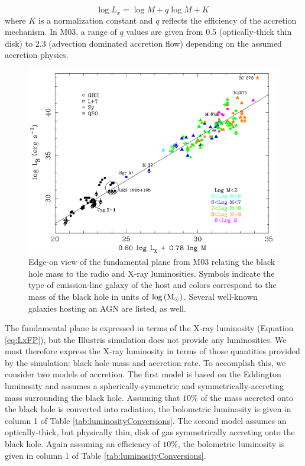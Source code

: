 \begin{equation}
\log L_{x}=\log M+q\log\dot{M}+K\;\label{eq:LxFP}
\end{equation}
where $K$ is a normalization constant and $q$ reflects the efficiency
of the accretion mechanism. In M03, a range of $q$ values are given
from 0.5 (optically-thick thin disk) to 2.3 (advection dominated accretion
flow) depending on the assumed accretion physics.
\begin{figure}
\centering{}\includegraphics[clip,scale=0.35]{Figures/FP}\protect\caption{\label{fig:Fp}Edge-on view of the fundamental plane from M03 relating
the black hole mass to the radio and X-ray luminosities. Symbols indicate
the type of emission-line galaxy of the host and colors correspond
to the mass of the black hole in units of $\log\left({\rm M}_{\odot}\right)$.
Several well-known galaxies hosting an AGN are listed, as well.}
\end{figure}


The fundamental plane is expressed in terms of the X-ray luminosity
(Equation \ref{eq:LxFP}), but the Illustris simulation does not provide
any luminosities. We must therefore express the X-ray luminosity in
terms of those quantities provided by the simulation: black hole mass
and accretion rate. To accomplish this, we consider two models of
accretion. The first model is based on the Eddington luminosity and
assumes a spherically-symmetric and symmetrically-accreting mass surrounding
the black hole. Assuming that $10\%$ of the mass accreted onto the
black hole is converted into radiation, the bolometric luminosity
is given in column 1 of Table \ref{tab:luminosityConversions}. The
second model assumes an optically-thick, but physically thin, disk
of gas symmetrically accreting onto the black hole. Again assuming
an efficiency of $10\%$, the bolometric luminosity is given in column
1 of Table \ref{tab:luminosityConversions}.

